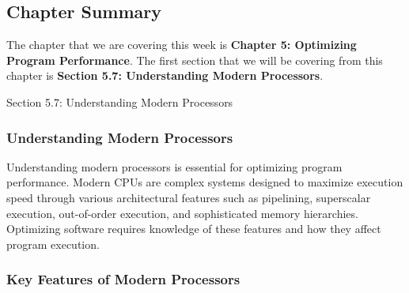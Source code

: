 \subsection{Chapter Summary}

The chapter that we are covering this week is \textbf{Chapter 5: Optimizing Program Performance}. The first section that we will be covering from this chapter is \textbf{Section 5.7: Understanding Modern Processors}.

\begin{notes}{Section 5.7: Understanding Modern Processors}
    \subsubsection*{Understanding Modern Processors}

    Understanding modern processors is essential for optimizing program performance. Modern CPUs are complex systems designed to maximize execution speed through various architectural features such as 
    pipelining, superscalar execution, out-of-order execution, and sophisticated memory hierarchies. Optimizing software requires knowledge of these features and how they affect program execution. \vspace*{1em}
    
    \subsubsection*{Key Features of Modern Processors}
    

\end{notes}
